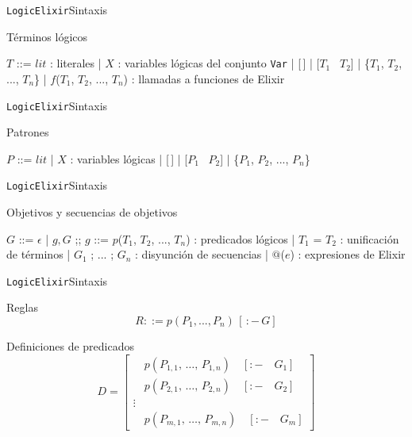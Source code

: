\documentclass[14pt,aspectratio=169]{beamer}
\begin{document}
\begin{frame}{\texttt{LogicElixir}}{Sintaxis}
  \footnotesize \begin{block}{Términos lógicos}
    \begin{bnfgrammar}
      $T$ ::= $lit$ : literales
        | $X$ : variables lógicas del conjunto \texttt{Var}
        | [\,]
        | [$T_1$ \textbar\ $T_2$]
        | \{$T_1$, $T_2$, ..., $T_n$\}
        | $f$($T_1$, $T_2$, ..., $T_n$) : llamadas a funciones de Elixir
    \end{bnfgrammar}
  \end{block}
\end{frame}

\begin{frame}{\texttt{LogicElixir}}{Sintaxis}
  \begin{block}{Patrones}
    \begin{bnfgrammar}
      $P$ ::= $lit$
      | $X$ : variables lógicas
      | [\,]
      | [$P_1$ \textbar\ $P_2$]
      | \{$P_1$, $P_2$, ..., $P_n$\}
    \end{bnfgrammar}
  \end{block}
\end{frame}

\begin{frame}{\texttt{LogicElixir}}{Sintaxis}
  \footnotesize \begin{block}{Objetivos y secuencias de objetivos}
    \begin{bnfgrammar}
      $G$ ::= $\epsilon$ | $g, G$
    ;;
      $g$ ::= $p$($T_1$, $T_2$, ..., $T_n$) : predicados lógicos
          | $T_1$ = $T_2$ : unificación de términos
          | $G_1$ ; ... ; $G_n$ : disyunción de secuencias
          | $@$($e$) : expresiones de Elixir
    \end{bnfgrammar}
  \end{block}
\end{frame}

\begin{frame}{\texttt{LogicElixir}}{Sintaxis}
  \begin{block}{Reglas}
    \begin{equation*}
      R ::= p(P_1, ..., P_n)\,[\,:-\, G]
    \end{equation*}
  \end{block}
  \begin{block}{Definiciones de predicados}
    \begin{equation*}
      D =
      \begin{bmatrix}
        \quad p(P_{1,1},\, \ldots,\, P_{1,n}) \quad [:- \quad G_1]\\
        \quad p(P_{2,1},\, \ldots,\, P_{2,n}) \quad [:- \quad G_2]\\
        \vdots \\
        \quad p(P_{m,1},\, \ldots,\, P_{m,n}) \quad [:- \quad G_m]
      \end{bmatrix}
    \end{equation*}
  \end{block}
\end{frame}
\end{document}
